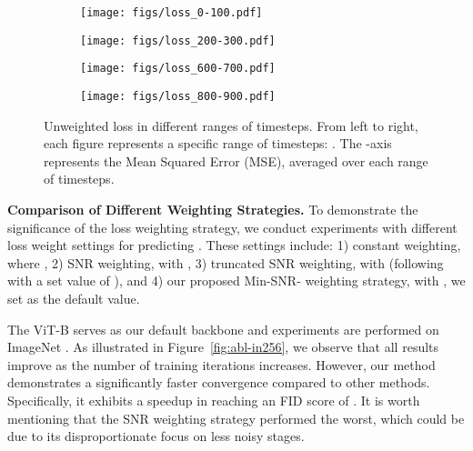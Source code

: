 \begin{figure*}[!h]
    \centering
    \begin{subfigure}[b]{0.245\textwidth}
        \centering
        \texttt{[image: figs/loss\_0-100.pdf]}
    \end{subfigure}
    \hspace{-2mm}
\begin{subfigure}[b]{0.245\textwidth}
        \centering
        \texttt{[image: figs/loss\_200-300.pdf]}
    \end{subfigure}
\hspace{-2mm}
    \begin{subfigure}[b]{0.245\textwidth}
        \centering
        \texttt{[image: figs/loss\_600-700.pdf]}
    \end{subfigure}
    \hspace{-2mm}
    \begin{subfigure}[b]{0.25\textwidth}
        \centering
        \texttt{[image: figs/loss\_800-900.pdf]}
    \end{subfigure}
    \vspace{-0.3cm}
    \caption{
    Unweighted loss in different ranges of timesteps. From left to right, each figure represents a specific range of timesteps: . The -axis represents the Mean Squared Error (MSE), averaged over each range of timesteps.}
    \label{fig:viz-loss-diff-schedule}
\end{figure*}


\noindent \textbf{Comparison of Different Weighting Strategies.}
To demonstrate the significance of the loss weighting strategy, we conduct experiments with different loss weight settings for predicting . 
These settings include: 
1) constant weighting, where , 
2) SNR weighting, with , 
3) truncated SNR weighting, with  (following~\cite{salimans2022distillprogressive} with a set value of ), and 4) our proposed Min-SNR- weighting strategy, with , we set  as the default value.

The ViT-B serves as our default backbone and experiments are performed on ImageNet . As illustrated in Figure~\ref{fig:abl-in256}, we observe that all results improve as the number of training iterations increases. However, our method demonstrates a significantly faster convergence compared to other methods. Specifically, it exhibits a  speedup in reaching an FID score of . It is worth mentioning that the SNR weighting strategy performed the worst, which could be due to its disproportionate focus on less noisy stages.


